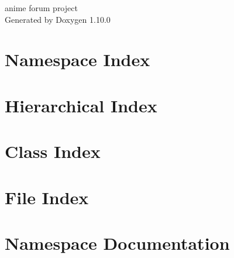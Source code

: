 \documentclass[twoside]{book}
\newcommand{\+}{\discretionary{\mbox{\scriptsize$\hookleftarrow$}}{}{}}
\newcommand{\clearemptydoublepage}{%
    \newpage{\pagestyle{empty}\cleardoublepage}%
  }
\begin{document}
  \raggedbottom
    \hypersetup{pageanchor=false,
                bookmarksnumbered=true,
                pdfencoding=unicode
               }
  \begin{titlepage}
  \vspace*{7cm}
  \begin{center}%
  {\Large anime forum project}\\
  \vspace*{1cm}
  {\large Generated by Doxygen 1.10.0}\\
  \end{center}
  \end{titlepage}
  \clearemptydoublepage
  \tableofcontents
  \clearemptydoublepage
  \hypersetup{pageanchor=true}
\chapter{Namespace Index}

\chapter{Hierarchical Index}

\chapter{Class Index}

\chapter{File Index}

\chapter{Namespace Documentation}



















\end{document}
